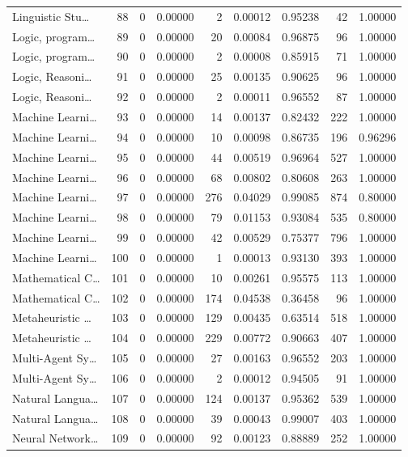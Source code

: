 \begin{table}
\begin{tabular}{lrrrrrrrr}
Linguistic Stu… & 88 & 0 & 0.00000 & 2 & 0.00012 & 0.95238 & 42 & 1.00000 \\
Logic, program… & 89 & 0 & 0.00000 & 20 & 0.00084 & 0.96875 & 96 & 1.00000 \\
Logic, program… & 90 & 0 & 0.00000 & 2 & 0.00008 & 0.85915 & 71 & 1.00000 \\
Logic, Reasoni… & 91 & 0 & 0.00000 & 25 & 0.00135 & 0.90625 & 96 & 1.00000 \\
Logic, Reasoni… & 92 & 0 & 0.00000 & 2 & 0.00011 & 0.96552 & 87 & 1.00000 \\
Machine Learni… & 93 & 0 & 0.00000 & 14 & 0.00137 & 0.82432 & 222 & 1.00000 \\
Machine Learni… & 94 & 0 & 0.00000 & 10 & 0.00098 & 0.86735 & 196 & 0.96296 \\
Machine Learni… & 95 & 0 & 0.00000 & 44 & 0.00519 & 0.96964 & 527 & 1.00000 \\
Machine Learni… & 96 & 0 & 0.00000 & 68 & 0.00802 & 0.80608 & 263 & 1.00000 \\
Machine Learni… & 97 & 0 & 0.00000 & 276 & 0.04029 & 0.99085 & 874 & 0.80000 \\
Machine Learni… & 98 & 0 & 0.00000 & 79 & 0.01153 & 0.93084 & 535 & 0.80000 \\
Machine Learni… & 99 & 0 & 0.00000 & 42 & 0.00529 & 0.75377 & 796 & 1.00000 \\
Machine Learni… & 100 & 0 & 0.00000 & 1 & 0.00013 & 0.93130 & 393 & 1.00000 \\
Mathematical C… & 101 & 0 & 0.00000 & 10 & 0.00261 & 0.95575 & 113 & 1.00000 \\
Mathematical C… & 102 & 0 & 0.00000 & 174 & 0.04538 & 0.36458 & 96 & 1.00000 \\
Metaheuristic … & 103 & 0 & 0.00000 & 129 & 0.00435 & 0.63514 & 518 & 1.00000 \\
Metaheuristic … & 104 & 0 & 0.00000 & 229 & 0.00772 & 0.90663 & 407 & 1.00000 \\
Multi-Agent Sy… & 105 & 0 & 0.00000 & 27 & 0.00163 & 0.96552 & 203 & 1.00000 \\
Multi-Agent Sy… & 106 & 0 & 0.00000 & 2 & 0.00012 & 0.94505 & 91 & 1.00000 \\
Natural Langua… & 107 & 0 & 0.00000 & 124 & 0.00137 & 0.95362 & 539 & 1.00000 \\
Natural Langua… & 108 & 0 & 0.00000 & 39 & 0.00043 & 0.99007 & 403 & 1.00000 \\
Neural Network… & 109 & 0 & 0.00000 & 92 & 0.00123 & 0.88889 & 252 & 1.00000 \\

\end{tabular}
\end{table}
